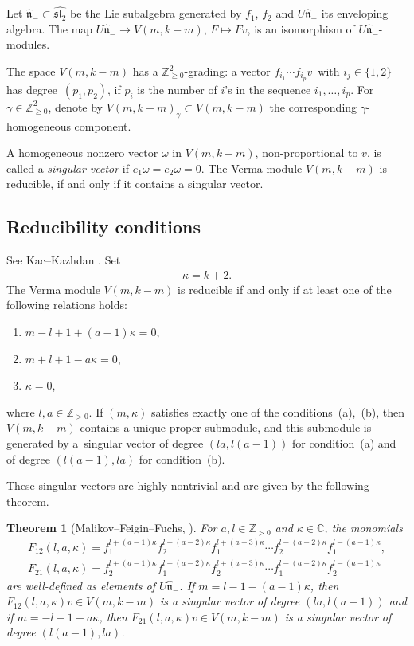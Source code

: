 \documentclass[pdftex]{sigma}
\numberwithin{equation}{section}
\newtheorem{thm}{Theorem}[section]
\begin{document}
Let $\hat{\mathfrak{n}}_-\subset\widehat{{\mathfrak{sl}_2}}$ be the Lie subalgebra generated by $f_1$, $f_2$ and $U\hat{\mathfrak{n}}_-$ its enveloping algebra. The map $U\hat{\mathfrak{n}}_-\to V(m,k-m)$, $F\mapsto Fv$, is an isomorphism of $U\hat{\mathfrak{n}}_-$-modules.

The space $V(m,k-m)$ has a ${\mathbb Z}^2_{\geq 0}$-grading: a vector $f_{i_1}\cdots f_{i_p}v$\ with $i_j\in\{1,2\}$ has deg\-ree~$(p_1,p_2)$, if $p_i$ is the number of $i$'s in the sequence $i_1,\dots,i_p$. For $\gamma\in{\mathbb Z}^2_{\geq 0}$, denote by $V(m,k-m)_{\gamma}\subset V(m,k-m)$ the corresponding $\gamma$-homogeneous component.

A homogeneous nonzero vector $\omega$ in $V(m,k-m)$, non-proportional to $v$, is called a {\em singular vector} if $e_1\omega=e_2\omega=0$. The Verma module $V(m,k-m)$ is reducible, if and only if it contains a singular vector.

\subsection{Reducibility conditions}\label{reduc}
See Kac--Kazhdan \cite{KK}. Set
\begin{gather*}
\kappa=k+2.
\end{gather*}
The Verma module $V(m,k-m)$ is reducible if and only if at least one of the following relations holds:
\begin{enumerate}\itemsep=0pt
\item[(a)] $m-l+1+(a-1)\kappa=0$,
\item[(b)] $m+l+1-a\kappa=0$,
\item[(c)] $\kappa=0$,
\end{enumerate}
where $l,a\in{\mathbb Z}_{>0}$. If $(m,\kappa)$ satisfies exactly one of the conditions~(a),~(b), then $V(m,k-m)$ contains a unique proper submodule, and this submodule is generated by a~singular vector of degree $(la,l(a-1))$ for condition~(a) and of degree $(l(a-1),la)$ for condition~(b).

These singular vectors are highly nontrivial and are given by the following theorem.

\begin{thm}[{Malikov--Feigin--Fuchs, \cite{MFF}}]\label{thm MFF} For $a, l\in{\mathbb Z}_{>0}$ and $\kappa\in {\mathbb C}$, the monomials
\begin{gather*}
F_{12}(l,a,\kappa) = f_1^{l+(a-1)\kappa}f_2^{l+(a-2)\kappa} f_1^{l+(a-3)\kappa}\cdots f_2^{l-(a-2)\kappa} f_1^{l-(a-1)\kappa}, \\ %
F_{21}(l,a,\kappa) = f_2^{l+(a-1)\kappa}f_1^{l+(a-2)\kappa} f_2^{l+(a-3)\kappa}\cdots f_1^{l-(a-2)\kappa} f_2^{l-(a-1)\kappa} \nonumber
\end{gather*}
are well-defined as elements of $U\hat{\mathfrak{n}}_-$. If $m=l-1-(a-1)\kappa$, then $F_{12}(l,a,\kappa)v\in V(m,k-m)$ is a singular vector of degree $(la,l(a-1))$ and if $m=-l-1+a\kappa$, then $F_{21}(l,a,\kappa)v\in V(m,k-m)$ is a singular vector of degree $(l(a-1),la)$.
\end{thm}
\end{document}
